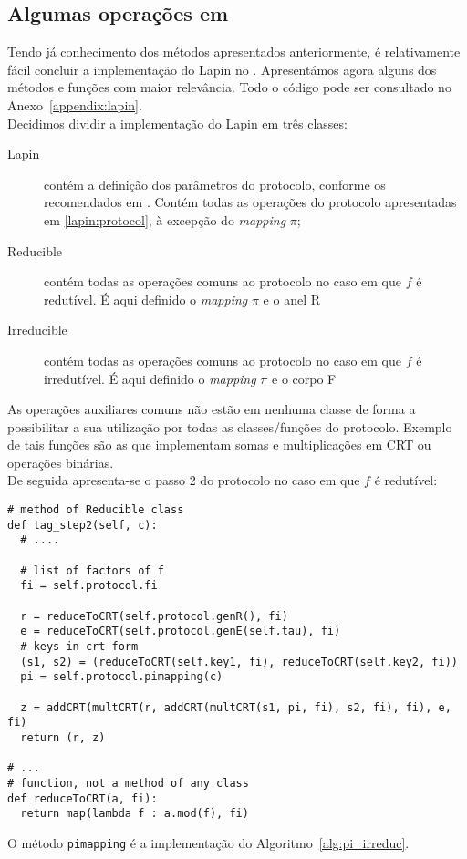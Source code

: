 \subsection{Algumas operações em \sage}
Tendo já conhecimento dos métodos apresentados anteriormente, é relativamente fácil concluir a implementação do Lapin no \sage. Apresentámos agora alguns dos métodos e funções com maior relevância. Todo o código pode ser consultado no Anexo~\ref{appendix:lapin}.\\
Decidimos dividir a implementação do Lapin em três classes:
\begin{description}
  \item[Lapin] contém a definição dos parâmetros do protocolo, conforme os recomendados em \cite{lapin}. Contém todas as operações do protocolo apresentadas em \ref{lapin:protocol}, à excepção do \textit{mapping} $\pi$;
  \item[Reducible] contém todas as operações comuns ao protocolo no caso em que $f$ é redutível. É aqui definido o \textit{mapping} $\pi$ e o anel \textsf{R}
  \item[Irreducible] contém todas as operações comuns ao protocolo no caso em que $f$ é irredutível. É aqui definido o \textit{mapping} $\pi$ e o corpo \textsf{F}
\end{description}
As operações auxiliares comuns não estão em nenhuma classe de forma a possibilitar a sua utilização por todas as classes/funções do protocolo. Exemplo de tais funções são as que implementam somas e multiplicações em CRT ou operações binárias.\\
De seguida apresenta-se o passo 2 do protocolo no caso em que $f$ é redutível:
\begin{lstlisting}[style=sage]
# method of Reducible class
def tag_step2(self, c):
  # ....
  
  # list of factors of f
  fi = self.protocol.fi

  r = reduceToCRT(self.protocol.genR(), fi)
  e = reduceToCRT(self.protocol.genE(self.tau), fi)
  # keys in crt form
  (s1, s2) = (reduceToCRT(self.key1, fi), reduceToCRT(self.key2, fi))
  pi = self.protocol.pimapping(c)

  z = addCRT(multCRT(r, addCRT(multCRT(s1, pi, fi), s2, fi), fi), e, fi)
  return (r, z)
  
# ...
# function, not a method of any class
def reduceToCRT(a, fi):
  return map(lambda f : a.mod(f), fi)
\end{lstlisting}
O método \verb|pimapping| é a implementação do Algoritmo~\ref{alg:pi_irreduc}.\\

